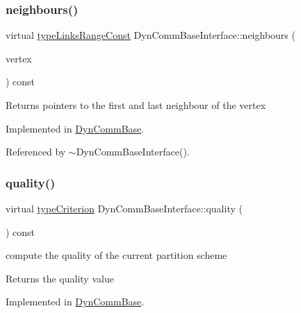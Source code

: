 \subsubsection{\texorpdfstring{neighbours()}{neighbours()}}
{\footnotesize\ttfamily virtual \hyperlink{graphInterface_8h_ae8d27008f15586bbf419af7ad2e0a48a}{type\+Links\+Range\+Const} Dyn\+Comm\+Base\+Interface\+::neighbours (\begin{DoxyParamCaption}\item[{\hyperlink{edge_8h_a5fbd20c46956d479cb10afc9855223f6}{type\+Vertex}}]{vertex }\end{DoxyParamCaption}) const\hspace{0.3cm}{\ttfamily [pure virtual]}}

\begin{DoxyReturn}{Returns}
pointers to the first and last neighbour of the vertex 
\end{DoxyReturn}


Implemented in \hyperlink{classDynCommBase_a3500faab82a0547422b2202b79f49718}{Dyn\+Comm\+Base}.



Referenced by $\sim$\+Dyn\+Comm\+Base\+Interface().

\mbox{\label{classDynCommBaseInterface_a42863260fe57e0982be227255d4f8464}} 
\subsubsection{\texorpdfstring{quality()}{quality()}}
{\footnotesize\ttfamily virtual \hyperlink{criterionInterface_8h_af71ff22f6355fd69a4a62104bfd59a83}{type\+Criterion} Dyn\+Comm\+Base\+Interface\+::quality (\begin{DoxyParamCaption}{ }\end{DoxyParamCaption}) const\hspace{0.3cm}{\ttfamily [pure virtual]}}

compute the quality of the current partition scheme

\begin{DoxyReturn}{Returns}
the quality value 
\end{DoxyReturn}


Implemented in \hyperlink{classDynCommBase_a316b2c63a025810211d205ef6bf1d06c}{Dyn\+Comm\+Base}.



